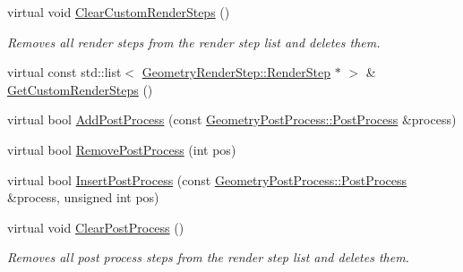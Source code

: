 \begin{DoxyCompactItemize}
\item 
\mbox{\label{class_geometry_engine_1_1_geometry_world_item_1_1_geometry_camera_1_1_camera_a59c06151d81ffaa11cd725e17d27429e}} 
virtual void \mbox{\hyperlink{class_geometry_engine_1_1_geometry_world_item_1_1_geometry_camera_1_1_camera_a59c06151d81ffaa11cd725e17d27429e}{Clear\+Custom\+Render\+Steps}} ()
\begin{DoxyCompactList}\small\item\em Removes all render steps from the render step list and deletes them. \end{DoxyCompactList}\item 
virtual const std\+::list$<$ \mbox{\hyperlink{class_geometry_engine_1_1_geometry_render_step_1_1_render_step}{Geometry\+Render\+Step\+::\+Render\+Step}} $\ast$ $>$ \& \mbox{\hyperlink{class_geometry_engine_1_1_geometry_world_item_1_1_geometry_camera_1_1_camera_a55464c946d6e07ea8f00f5236593ee5f}{Get\+Custom\+Render\+Steps}} ()
\item 
virtual bool \mbox{\hyperlink{class_geometry_engine_1_1_geometry_world_item_1_1_geometry_camera_1_1_camera_aefeabe0fe7650e0b6236b59134058845}{Add\+Post\+Process}} (const \mbox{\hyperlink{class_geometry_engine_1_1_geometry_post_process_1_1_post_process}{Geometry\+Post\+Process\+::\+Post\+Process}} \&process)
\item 
virtual bool \mbox{\hyperlink{class_geometry_engine_1_1_geometry_world_item_1_1_geometry_camera_1_1_camera_ae66b1cfa82e67349786b3cf412f93e70}{Remove\+Post\+Process}} (int pos)
\item 
virtual bool \mbox{\hyperlink{class_geometry_engine_1_1_geometry_world_item_1_1_geometry_camera_1_1_camera_a6079f2bacb9134ca0c3d7e8a97993f8c}{Insert\+Post\+Process}} (const \mbox{\hyperlink{class_geometry_engine_1_1_geometry_post_process_1_1_post_process}{Geometry\+Post\+Process\+::\+Post\+Process}} \&process, unsigned int pos)
\item 
\mbox{\label{class_geometry_engine_1_1_geometry_world_item_1_1_geometry_camera_1_1_camera_a97e992ac9c5429aebca4797f5e545e46}} 
virtual void \mbox{\hyperlink{class_geometry_engine_1_1_geometry_world_item_1_1_geometry_camera_1_1_camera_a97e992ac9c5429aebca4797f5e545e46}{Clear\+Post\+Process}} ()
\begin{DoxyCompactList}\small\item\em Removes all post process steps from the render step list and deletes them. \end{DoxyCompactList}\item 

\end{DoxyCompactItemize}
